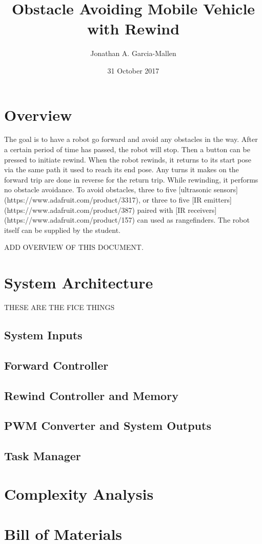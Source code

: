 \documentclass{article}
\title{Obstacle Avoiding Mobile Vehicle with Rewind}
\author{Jonathan A. Garcia-Mallen}
\date{31 October 2017}
\begin{document}
\maketitle

\section*{Overview} 
The goal is to have a robot go forward and avoid any obstacles in the way. After a certain period of time has passed, the robot will stop. Then a button can be pressed to initiate rewind. When the robot rewinds, it returns to its start pose via the same path it used to reach its end pose. Any turns it makes on the forward trip are done in reverse for the return trip. While rewinding, it performs no obstacle avoidance. To avoid obstacles, three to five [ultrasonic sensors](https://www.adafruit.com/product/3317), or three to five [IR emitters](https://www.adafruit.com/product/387) paired with [IR receivers](https://www.adafruit.com/product/157) can used as rangefinders. The robot itself can be supplied by the student.   

ADD OVERVIEW OF THIS DOCUMENT. 
\section*{System Architecture} 
THESE ARE THE FICE THINGS
\subsection*{System Inputs}
\subsection*{Forward Controller}
\subsection*{Rewind Controller and Memory}
\subsection*{PWM Converter and System Outputs}
\subsection*{Task Manager} 

\section*{Complexity Analysis}

\section*{Bill of Materials}
\end{document}
